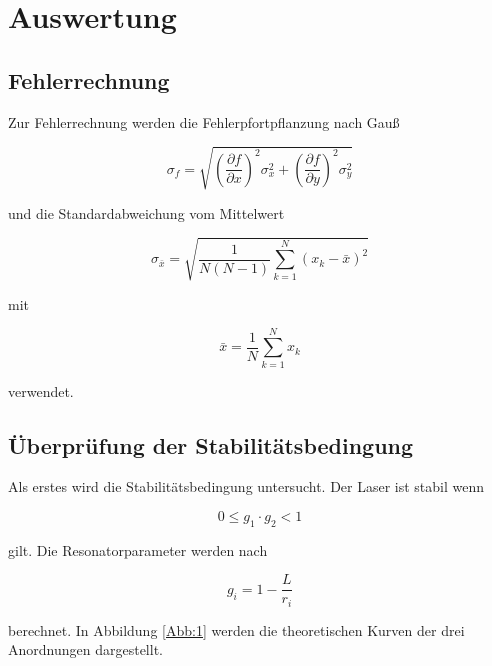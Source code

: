 \section{Auswertung}
\label{sec:Auswertung}

\subsection{Fehlerrechnung}
  Zur Fehlerrechnung werden die Fehlerpfortpflanzung nach Gauß

  \begin{equation}
    \sigma_f = \sqrt{ \left( \frac{\partial f}{\partial x} \right)^2 \sigma_x^2 + \left( \frac{\partial f}{\partial y} \right)^2 \sigma_y^2 }
  \end{equation}

  und die Standardabweichung vom Mittelwert

  \begin{equation}
    \sigma_{\bar{x}} = \sqrt{ \frac{1}{N \left(N-1 \right)} \sum_{k=1}^{N} \left(x_k - \bar{x} \right)^2 }
    \label{Fehler:1}
  \end{equation}

  mit

  \begin{equation}
    \bar{x} = \frac{1}{N} \sum_{k=1}^{N} x_k
    \label{Fehler:2}
  \end{equation}

  verwendet.

\subsection{Überprüfung der Stabilitätsbedingung}
  Als erstes wird die Stabilitätsbedingung untersucht. Der Laser ist stabil wenn

  \begin{equation}
    0 \le g_1 \cdot g_2 < 1
    \label{Eqn:1}
  \end{equation}

  gilt. Die Resonatorparameter werden nach

  \begin{equation}
    g_i = 1 - \frac{L}{r_i}
    \label{Eqn:2}
  \end{equation}

  berechnet. In Abbildung \ref{Abb:1} werden die theoretischen Kurven der drei
  Anordnungen dargestellt.

